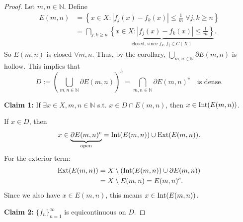 \begin{proof}
    Let $m, n \in \mathbb{N}$. Define 
    \begin{align*}
        E(m , n) &= \left\{ x \in X : \left| f_j(x) - f_k(x) \right| \leq \frac{1}{m} \; \forall j,k 
        \geq n \right\} \\
                &= \bigcap_{j, k \geq n} \underbrace{\left\{ x \in X : \left| f_j(x) - f_k(x) \right| 
                \leq \frac{1}{m} \right\} }_{\text{closed, since }f_k, f_j \in C(X)}.
    \end{align*}
    So $E(m ,n)$ is closed $\forall m, n$. Thus, by the corollary, $\bigcup_{m, n \in \mathbb{N}} 
    \partial E(m ,n)$ is hollow. This implies that
    \[
    D := \left(\bigcup_{m , n \in \mathbb{N}} \partial E(m ,n)\right)^c = \bigcap_{m, n \in \mathbb{N}}
     \partial E(m ,n)^c \quad \text{is dense.}
    \]

    \noindent \textbf{Claim 1:} If $\exists x \in X, m, n \in \mathbb{N}$ s.t. $x \in D \cap E(m,n)$, 
    then $x \in \operatorname{Int}(E(m,n))$.

    \noindent If $x \in D$, then
    \[
    x \in \underbrace{\partial E(m,n)^c}_{\text{open}} = \operatorname{Int}(E(m,n)) \cup \operatorname{Ext}(E(m,n)).
    \]
    For the exterior term:
    \begin{align*}
    \operatorname{Ext}(E(m,n)) &= X \setminus (\operatorname{Int}(E(m,n)) \cup \partial E(m,n)) \\
    &= X \setminus E(m,n) = E(m,n)^c.
    \end{align*}
    Since we also have $x \in E(m,n)$, this means $x \in \operatorname{Int}(E(m,n))$.

    \noindent \textbf{Claim 2:} $\{f_{n}\}_{n=1}^{\infty}$ is equicontinuous on $D$.


\end{proof}
